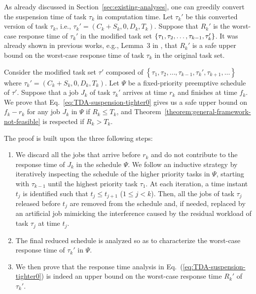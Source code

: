 
As already discussed in Section~\ref{sec:existing-analyses}, one can greedily convert the suspension time of task $\tau_k$ in computation time. Let $\tau_k'$ be this converted version of task $\tau_k$, i.e., $\tau_k' = (C_k + S_k, 0, D_k, T_k)$.  Suppose that $R_k'$ is the worst-case response time of $\tau_k'$ in the modified task set $\left\{{\tau_1, \tau_2, \ldots, \tau_{k-1}, \tau_k'}\right\}$. It was already shown in previous works, e.g., Lemma~3 in
\cite{Liu_2014}, that $R_k'$ is a safe upper bound on the worst-case response time of task $\tau_k$ in the original task set.

Consider the modified task set $\tau'$ composed of $\left\{\tau_1, \tau_2, \ldots, \tau_{k-1}, \tau_k', \tau_{k+1}, \ldots \right\}$ where $\tau_k' = (C_k + S_k, 0, D_k, T_k)$. Let $\Psi$ be a fixed-priority preemptive schedule of $\tau'$.
Suppose that a job $J_{k}$ of task $\tau_k'$ arrives at time $r_k$ and finishes at time $f_k$. 
We prove that Eq.~\eqref{eq:TDA-suspension-tighter0} gives us a safe upper bound on $f_k-r_k$ for any job $J_k$ in $\Psi$ if $R_k \leq T_k$, and Theorem~\ref{theorem:general-framework-not-feasible} is respected if $R_k > T_k$.


The proof is built upon the three following steps:
\begin{enumerate}
\item We discard all the jobs that arrive before $r_k$ and do not contribute to the response time of $J_k$ in the schedule $\Psi$. We follow an inductive strategy by iteratively inspecting the schedule of the higher priority tasks in $\Psi$, starting with $\tau_{k-1}$ until the highest priority task $\tau_1$. At each iteration, a time instant $t_j$ is identified such that $t_j \leq t_{j+1}$ ($1 \leq j < k$). Then, all the jobs of task $\tau_j$ released before $t_j$ are removed from the schedule and, if needed, replaced by an artificial job mimicking the interference caused by the residual workload of task $\tau_j$ at time $t_j$. %
\item The final reduced schedule is analyzed so as to characterize the
  worst-case response time of $\tau_k'$ in $\Psi$. %
\item We then prove that the response time analysis in Eq.~(\ref{eq:TDA-suspension-tighter0}) is indeed an upper bound on the worst-case response time $R_k'$ of $\tau_k'$.
\end{enumerate}

